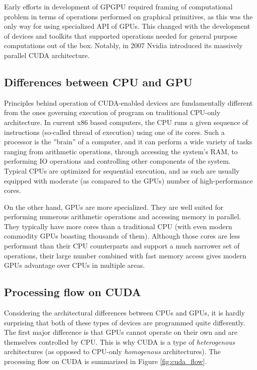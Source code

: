 Early efforts in development of GPGPU required framing of computational problem in terms of operations performed on graphical primitives, as this was the only way for using specialized API of GPUs. This changed with the development of devices and toolkits that supported operations needed for general purpose computations out of the box. Notably, in 2007 Nvidia introduced its massively parallel CUDA architecture.

\subsection{Differences between CPU and GPU}
Principles behind operation of CUDA-enabled devices are fundamentally different from the ones governing execution of program on traditional CPU-only architecture. In current x86 based computers, the CPU runs a given sequence of instructions (so-called thread of execution) using one of its cores. Such a processor is the ''brain'' of a computer, and it can perform a wide variety of tasks ranging from arithmetic operations, through accessing the system's RAM, to performing IO operations and controlling other components of the system. Typical CPUs are optimized for sequential execution, and as such are usually equipped with moderate (as compared to the GPUs) number of high-performance cores.

On the other hand, GPUs are more specialized. They are well suited for performing numerous arithmetic operations and accessing memory in parallel. They typically have more cores than a traditional CPU (with even modern commodity GPUs boasting thousands of them). Although those cores are less performant than their CPU counterparts and support a much narrower set of operations, their large number combined with fast memory access gives modern GPUs advantage over CPUs in multiple areas.

\subsection{Processing flow on CUDA}
Considering the architectural differences between CPUs and GPUs, it is hardly surprising that both of these types of devices are programmed quite differently. The first major difference is that GPUs cannot operate on their own and are themselves controlled by CPU. This is why CUDA is a type of \emph{heterogenous} architectures (as opposed to CPU-only \emph{homogenous} architectures). The processing flow on CUDA is summarized in Figure \ref{fig:cuda_flow}.

